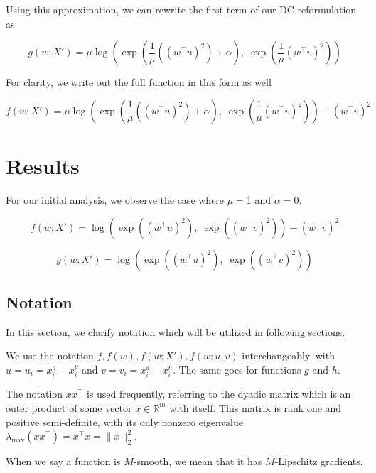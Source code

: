 \documentclass[11pt]{article}
\begin{document}
Using this approximation, we can rewrite the first term of our DC reformulation as

\begin{equation}
    g(w; X') = \mu \log(\exp(\frac{1}{\mu}((w^{\top} u)^2) + \alpha), \; \exp(\frac{1}{\mu}(w^{\top} v)^2))
\end{equation}

For clarity, we write out the full function in this form as well

\begin{equation}
\label{eq:full_smooth_margin_f}
    f(w; X') = \mu \log(\exp(\frac{1}{\mu}((w^{\top} u)^2) + \alpha), \; \exp(\frac{1}{\mu}(w^{\top} v)^2)) - (w^{\top} v)^2
\end{equation}

\section{Results}

For our initial analysis, we observe the case where $\mu = 1$ and $\alpha = 0$.

\begin{equation}
    f(w; X') = \log(\exp((w^{\top} u)^2), \; \exp((w^{\top} v)^2)) - (w^{\top} v)^2 
\end{equation}

\begin{equation}
    g(w; X') = \log(\exp((w^{\top} u)^2), \; \exp((w^{\top} v)^2))
\end{equation}

\subsection{Notation}

In this section, we clarify notation which will be utilized in following sections.

We use the notation $f, f(w), f(w; X'), f(w; u, v)$ interchangeably, with $u = u_i = x_i^a - x_i^p$ and $v = v_i = x_i^a - x_i^n$. The same goes for functions $g$ and $h$.

The notation $xx^{\top}$ is used frequently, referring to the dyadic matrix which is an outer product of some vector $x \in \mathbb{R}^m$ with itself. This matrix is rank one and positive semi-definite, with its only nonzero eigenvalue $\lambda_{\max}(xx^{\top}) = x^{\top}x = \|x\|_2^2$.

When we say a function is $M$-smooth, we mean that it has $M$-Lipschitz gradients.
\end{document}
